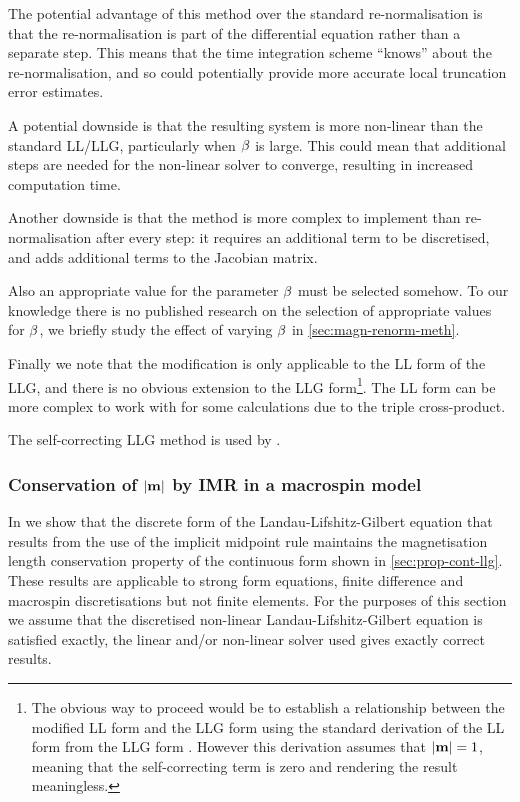 The potential advantage of this method over the standard re-normalisation is that the re-normalisation is part of the differential equation rather than a separate step.
This means that the time integration scheme ``knows'' about the re-normalisation, and so could potentially provide more accurate local truncation error estimates.

A potential downside is that the resulting system is more non-linear than the standard LL/LLG, particularly when $\beta$ is large.
This could mean that additional steps are needed for the non-linear solver to converge, resulting in increased computation time.

Another downside is that the method is more complex to implement than re-normalisation after every step: it requires an additional term to be discretised, and adds additional terms to the Jacobian matrix.

Also an appropriate value for the parameter $\beta$ must be selected somehow.
To our knowledge there is no published research on the selection of appropriate values for $\beta$, we briefly study the effect of varying $\beta$ in \cref{sec:magn-renorm-meth}.

Finally we note that the modification is only applicable to the LL form of the LLG, and there is no obvious extension to the LLG form\footnote{The obvious way to proceed would be to establish a relationship between the modified LL form and the LLG form using the standard derivation of the LL form from the LLG form \cite{Aharoni1996}.
However this derivation assumes that $\left|{\boldsymbol{\mathrm{m}}} \right| = 1$, meaning that the self-correcting term is zero and rendering the result meaningless.}.
The LL form can be more complex to work with for some calculations due to the triple cross-product.

The self-correcting LLG method is used by \nmag \cite{fangor-donahue-email} \cite{Fischbacher2009}.


\subsubsection{Conservation of $\left|{\boldsymbol{\mathrm{m}}} \right|$ by IMR in a macrospin model}
\label{sec:proof-magn-length-ode-imr-llg}

In  we show that the discrete form of the Landau-Lifshitz-Gilbert equation that results from the use of the implicit midpoint rule maintains the magnetisation length conservation property of the continuous form shown in \cref{sec:prop-cont-llg}.
These results are applicable to strong form equations, \ie finite difference and macrospin discretisations but not finite elements.
For the purposes of this section we assume that the discretised non-linear Landau-Lifshitz-Gilbert equation is satisfied exactly, \ie the linear and/or non-linear solver used gives exactly correct results.

